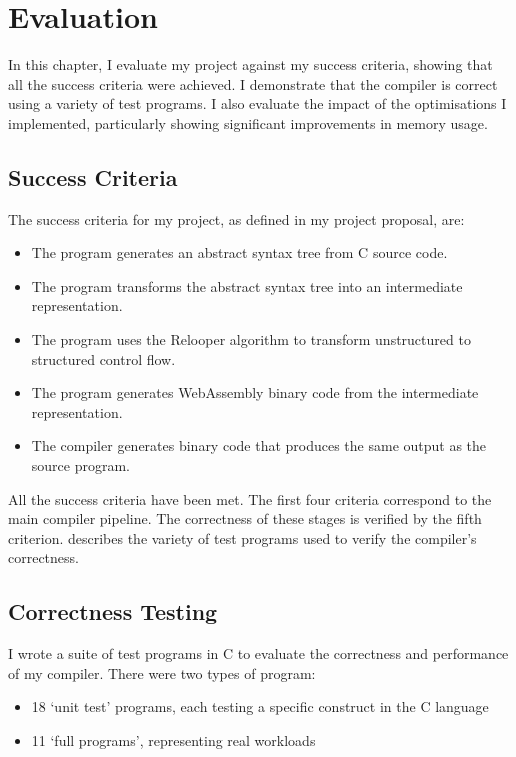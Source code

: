 \documentclass[00-main.tex]{subfiles}
\begin{document}
\chapter{Evaluation}

\newcommand{\IncludeStackPlot}[1]{\resizebox{0.98\textwidth}{!}{}}

In this chapter, I evaluate my project against my success criteria, showing that all the success criteria were achieved.
I demonstrate that the compiler is correct using a variety of test programs.
I also evaluate the impact of the optimisations I implemented, particularly showing significant improvements in memory usage.


\section{Success Criteria}\label{sec:eval:success criteria}

The success criteria for my project, as defined in my project proposal, are:
\begin{itemize}[nosep, itemsep=2pt]
\item The program generates an abstract syntax tree from C source code.
\item The program transforms the abstract syntax tree into an intermediate representation.
\item The program uses the Relooper algorithm to transform unstructured to structured control
flow.
\item The program generates WebAssembly binary code from the intermediate representation.
\item The compiler generates binary code that produces the same output as the source program.
\end{itemize}

All the success criteria have been met.
The first four criteria correspond to the main compiler pipeline.
The correctness of these stages is verified by the fifth criterion.
 describes the variety of test programs used to verify the compiler's correctness.


\section{Correctness Testing}\label{sec:eval:correctness testing}

I wrote a suite of test programs in C to evaluate the correctness and performance of my compiler.
There were two types of program:
\begin{itemize}[nosep, itemsep=2pt]
\item 18 `unit test' programs, each testing a specific construct in the C language
\item 11 `full programs', representing real workloads
\end{itemize}
\end{document}
